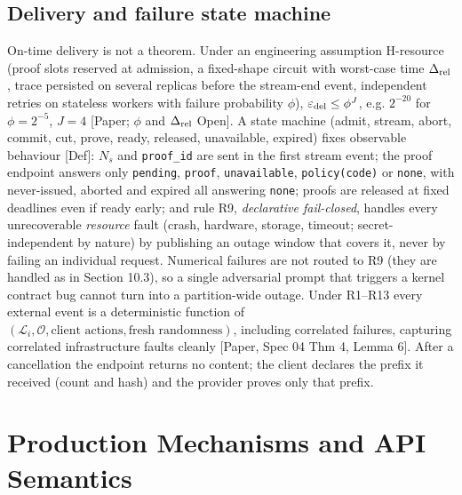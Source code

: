 \documentclass[10pt]{article}
\begin{document}
\subsection{Delivery and failure state machine}
On-time delivery is not a theorem. Under an engineering assumption H-resource (proof slots reserved at admission, a fixed-shape circuit with worst-case time $\Delta_{\rm rel}$, trace persisted on several replicas before the stream-end event, independent retries on stateless workers with failure probability $\phi$), $\varepsilon_{\rm del}\le\phi^J$, e.g. $2^{-20}$ for $\phi=2^{-5}$, $J=4$ [Paper; $\phi$ and $\Delta_{\rm rel}$ Open]. A state machine (admit, stream, abort, commit, cut, prove, ready, released, unavailable, expired) fixes observable behaviour [Def]: $N_s$ and \texttt{proof\_\allowbreak{}id} are sent in the first stream event; the proof endpoint answers only \texttt{pending}, \texttt{proof}, \texttt{unavailable}, \texttt{policy(code)} or \texttt{none}, with never-issued, aborted and expired all answering \texttt{none}; proofs are released at fixed deadlines even if ready early; and rule R9, \emph{declarative fail-closed}, handles every unrecoverable \emph{resource} fault (crash, hardware, storage, timeout; secret-independent by nature) by publishing an outage window that covers it, never by failing an individual request. Numerical failures are not routed to R9 (they are handled as in Section 10.3), so a single adversarial prompt that triggers a kernel contract bug cannot turn into a partition-wide outage. Under R1--R13 every external event is a deterministic function of $(\mathcal L_i,\mathcal O,\text{client actions},\text{fresh randomness})$, including correlated failures, capturing correlated infrastructure faults cleanly [Paper, Spec 04 Thm 4, Lemma 6]. After a cancellation the endpoint returns no content; the client declares the prefix it received (count and hash) and the provider proves only that prefix.

\section{Production Mechanisms and API Semantics}
\end{document}
